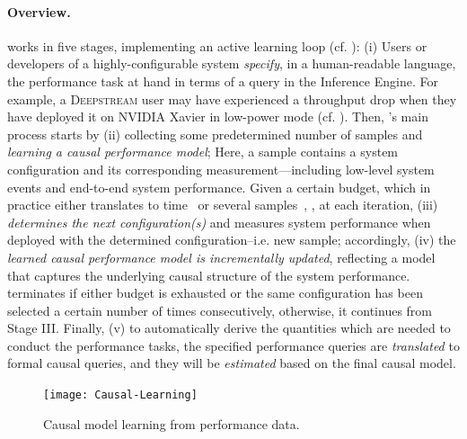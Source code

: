 \paragraph{Overview.}
\ourapproach works in five stages, implementing an active learning loop (cf. ): (i) Users or developers of a highly-configurable system \emph{specify}, in a human-readable language, the performance task at hand in terms of a query in the Inference Engine. For example, a \textsc{Deepstream} user may have experienced a throughput drop when they have deployed it on NVIDIA Xavier in low-power mode (cf. ). Then, \ourapproach's main process starts by (ii) collecting some predetermined number of samples and \emph{learning a causal performance model}; Here, a sample contains a system configuration and its corresponding measurement—including low-level system events and end-to-end system performance. Given a certain budget, which in practice either translates to time~\cite{iqbal2020flexibo} or several samples~\cite{jamshidi2016uncertainty}, \ourapproach, at each iteration, (iii) \emph{determines the next configuration(s)} and measures system performance when deployed with the determined configuration--i.e. new sample; accordingly, (iv) the \emph{learned causal performance model is incrementally updated}, reflecting a model that captures the underlying causal structure of the system performance. \ourapproach terminates if either budget is exhausted or the same configuration has been selected a certain number of times consecutively, otherwise, it continues from Stage III. Finally, (v) to automatically derive the quantities which are needed to conduct the performance tasks, the specified performance queries are \emph{translated} to formal causal queries, and they will be \emph{estimated} based on the final causal model.


\begin{figure}[tp!]
    \centering
    \texttt{[image: Causal-Learning]}
    \caption{\small {Causal model learning from performance data.}}
    
    \label{fig:causal_model_learning}
\end{figure}


